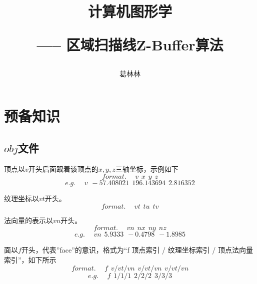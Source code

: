 \documentclass[10pt]{article}
\title{计算机图形学 \hspace{2pt}\hspace{2pt} \begin{large}----- \hspace{2pt} 区域扫描线Z-Buffer算法 \end{large} }
\author{葛林林}
\begin{document}
\maketitle


\section{预备知识}
\subsection{$obj$文件}
顶点以$v$开头后面跟着该顶点的$x,y,z$三轴坐标，示例如下
$$format. \hspace{15pt} v\hspace{5pt} x\hspace{5pt}y\hspace{5pt}z$$
$$e.g. \hspace{15pt} v\hspace{5pt} -57.408021\hspace{5pt}196.143694\hspace{5pt}2.816352$$

纹理坐标以$vt$开头。
$$format.\hspace{15pt} vt \hspace{5pt}tu \hspace{5pt} tv$$
$$$$

法向量的表示以$vn$开头。
$$format.\hspace{15pt} vn \hspace{5pt} nx \hspace{5pt} ny \hspace{5pt} nz$$
$$e.g. \hspace{15pt} vn \hspace{5pt} 5.9333 \hspace{5pt} -0.4798 \hspace{5pt} -1.8985$$

面以$f$开头，代表”face”的意识，格式为“f 顶点索引 / 纹理坐标索引 / 顶点法向量索引”，如下所示
$$format.\hspace{15pt} f \hspace{5pt} v/vt/vn \hspace{5pt} v/vt/vn \hspace{5pt} v/vt/vn$$
$$e.g.\hspace{15pt} f \hspace{5pt} 1/1/1 \hspace{5pt} 2/2/2 \hspace{5pt} 3/3/3$$
\end{document}

